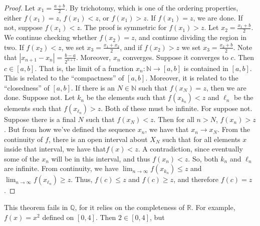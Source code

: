 \documentclass[crop=false,class=article,oneside]{standalone}
\begin{document}
            \begin{proof}
                Let $x_{1}=\frac{a+b}{2}$. By trichotomy,
                which is one of the ordering properties, either
                $f(x_{1})=z$, $f(x_{1})<z$, or $f(x_{1})>z$. If
                $f(x_{1})=z$, we are done. If not, suppose
                $f(x_{1})<z$. The proof is symmetric for
                $f(x_{1})>z$. Let $x_{2}=\frac{x_{1}+b}{2}$. We
                continue checking whether $f(x_{2})=z$, and continue
                dividing the region in two. If $f(x_{2})<z$, 
                we set $x_{3}=\frac{x_{1}+x_{2}}{2}$, and if
                $f(x_{2})>z$ we set $x_{3}=\frac{x_{2}+b}{2}$.
                Note that $|x_{n+1}-x_{n}|=\frac{b-a}{2^{n+1}}$.
                Moreover, $x_{n}$ converges. Suppose it converges to
                $c$. Then $c\in[a,b]$. That is, the limit of a
                function $x_{n}:\mathbb{N}\rightarrow[a,b]$ is
                contained in $[a,b]$. This is related to the
                ``compactness'' of $[a,b]$. Moreover, it is related
                to the ``closedness'' of $[a,b]$. If there is an
                $N\in\mathbb{N}$ such that $f(x_{N})=z$, then we are
                done. Suppose not. Let $k_{n}$ be the
                elements such that $f(x_{k_{n}})<z$ and $\ell_{n}$
                be the elements such that $f(x_{\ell_{n}})>z$.
                Both of these must be infinite. For suppose not.
                Suppose there is a final $N$ such that
                $f(x_{N})<z$. Then for all $n>N$, $f(x_{n})>z$.
                But from how we've defined the sequence $x_{n}$,
                we have that $x_{n}\rightarrow{x_{N}}$. From the
                continuity of $f$, there is an open interval
                about $X_{N}$ such that for all elements $x$
                inside that interval, we have that$f(x)<z$.
                A contradiction, since eventually some of the
                $x_{n}$ will be in this interval, and thus
                $f(x_{n})<z$. So, both $k_{n}$ and $\ell_{n}$ are
                infinite. From continuity, we have
                $\lim_{n\rightarrow\infty}f(x_{k_{n}})\leq{z}$
                and
                $\lim_{n\rightarrow\infty}f(x_{\ell_{n}})\geq{z}$.
                Thus, $f(c)\leq{z}$ and $f(c)\geq{z}$, and therefore
                $f(c)=z$.
            \end{proof}
            This theorem fails in $\mathbb{Q}$, for it relies on
            the completeness of $\mathbb{R}$. For example,
            $f(x)=x^{2}$ defined on $[0,4]$. Then $2\in[0,4]$, but
\end{document}
